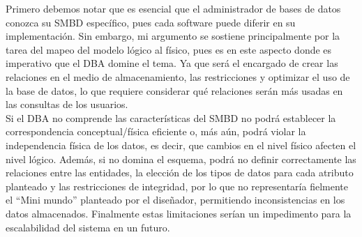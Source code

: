Primero debemos notar que es esencial que el administrador de bases de datos conozca su SMBD específico, pues cada software puede diferir en su implementación. Sin embargo, mi argumento se sostiene principalmente por la tarea del mapeo del modelo lógico al físico, pues es en este aspecto donde es imperativo que el DBA domine el tema.
Ya que será el encargado de crear las relaciones en el medio de almacenamiento, las restricciones y optimizar el uso de la base de datos, lo que requiere considerar qué relaciones serán más usadas en las consultas de los usuarios.\\
Si el DBA no comprende las características del SMBD no podrá establecer la correspondencia conceptual/física eficiente o, más aún, podrá violar la independencia física de los datos, es decir, que cambios en el nivel físico afecten el nivel lógico. Además, si no domina el esquema, podrá no definir correctamente las relaciones entre las entidades, la elección de los tipos de datos para cada atributo planteado y las restricciones de integridad, por lo que no representaría fielmente el ``Mini mundo'' planteado por el diseñador, permitiendo inconsistencias en los datos almacenados. Finalmente estas limitaciones serían un impedimento para la escalabilidad del sistema en un futuro.

